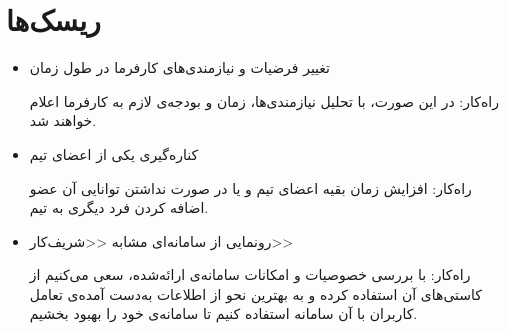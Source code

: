 \section{ریسک‌ها}

\begin{itemize}
	\item 
	تغییر فرضیات و نیازمندی‌های کارفرما در طول زمان
	
	راه‌کار:‌ در این صورت، با تحلیل نیازمندی‌ها، زمان و بودجه‌ی لازم به کارفرما اعلام خواهند شد.
	\item
	کناره‌گیری یکی از اعضای تیم
	
	راه‌کار: افزایش زمان بقیه اعضای تیم و یا در صورت نداشتن توانایی آن عضو اضافه کردن فرد دیگری به تیم.
	\item 
	رونمایی از سامانه‌ای مشابه <<شریف‌کار>>
	
	راه‌کار:‌ با بررسی خصوصیات و امکانات سامانه‌ی ارائه‌شده، سعی می‌کنیم از کاستی‌های آن استفاده کرده و به بهترین نحو از اطلاعات به‌دست آمده‌ی تعامل کاربران با آن سامانه استفاده کنیم تا سامانه‌ی خود را بهبود بخشیم. 
\end{itemize}

